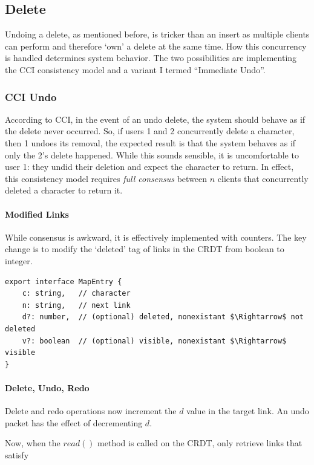 \documentclass[12pt,a4paper,twoside,openright]{report}
\begin{document}
	\subsection{Delete}
		Undoing a delete, as mentioned before, is tricker than an insert as multiple clients can perform and therefore `own' a delete at the same time. How this concurrency is handled determines system behavior. The two possibilities are implementing the CCI consistency model and a variant I termed ``Immediate Undo''.
		
		\subsubsection{CCI Undo} \label{sec:cciundo}
		According to CCI, in the event of an undo delete, the system should behave as if the delete never occurred. So, if users 1 and 2 concurrently delete a character, then 1 undoes its removal, the expected result is that the system behaves as if only the 2's delete happened. While this sounds sensible, it is uncomfortable to user 1: they undid their deletion and expect the character to return. In effect, this consistency model requires \textit{full consensus} between $n$ clients that concurrently deleted a character to return it.
		
			\paragraph{Modified Links}
			While consensus is awkward, it is effectively implemented with counters. The key change is to modify the `deleted' tag of links in the CRDT from boolean to integer.
			
\begin{lstlisting}[caption={New Type Signature of a Link in the CRDT}, mathescape=true]
export interface MapEntry {
	c: string,   // character
	n: string,   // next link
	d?: number,  // (optional) deleted, nonexistant $\Rightarrow$ not deleted
	v?: boolean  // (optional) visible, nonexistant $\Rightarrow$ visible
}
\end{lstlisting}

			\paragraph{Delete, Undo, Redo}
			Delete and redo operations now increment the $d$ value in the target link. An undo packet has the effect of decrementing $d$.
			
			Now, when the $read()$ method is called on the CRDT, only retrieve links that satisfy
			
\end{document}
